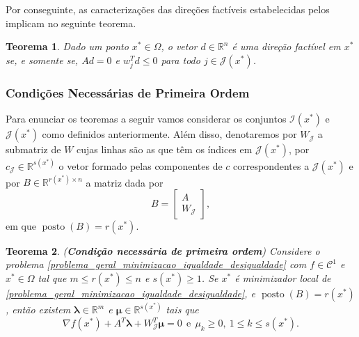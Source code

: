 \documentclass[12pt,a4paper]{scrartcl}
\DeclareMathOperator{\posto}{posto}
\def\RR{\mathds{R}}
\newtheorem{teo}{Teorema}
\theoremstyle{definition}%
\begin{document}
Por conseguinte, as caracterizações das direções factíveis estabelecidas pelos  implicam no seguinte teorema. 
\begin{teo} \label{teo:direcao_factivel_desigualdade_e_igualdade}
Dado um ponto $x^{*} \in \Omega$, o vetor $d\in \RR^{n}$ é uma direção factível em $x^{*}$ se, e somente se, $Ad =0$ e $w_{j}^{T}d \leq 0$ para todo $j\in \mathcal{J}(x^{*})$.
\end{teo}


\subsubsection{Condições Necessárias de Primeira Ordem}

Para enunciar os teoremas a seguir vamos considerar os conjuntos $\mathcal{I}(x^{*})$ e $\mathcal{J}(x^{*})$ como definidos anteriormente. Além disso, denotaremos por $W_{\mathcal{J}}$ a submatriz de $W$ cujas linhas são as que têm os índices em $\mathcal{J}(x^{*})$, por $c_{\mathcal{J}} \in \RR^{s(x^{*})}$ o vetor formado pelas componentes de $c$ correspondentes a $\mathcal{J}(x^{*})$ e por $B \in \RR^{r(x^{*})\times n}$ a matriz dada por
\[
B = \begin{bmatrix*} A \\ W_{\mathcal{J}} \end{bmatrix*} ,
\]
em que $\posto (B)= r(x^{*})$.
\begin{teo}(\textbf{Condição necessária de primeira ordem}) \label{teo:KKT}
Considere o problema \eqref{problema_geral_minimizacao_igualdade_desigualdade} com $f\in \mathcal{C}^{1}$ e $x^{*} \in \Omega$ tal que $m\leq r(x^{*}) \leq n$ e $s(x^{*}) \geq 1$.
Se $x^{*}$ é minimizador local de \eqref{problema_geral_minimizacao_igualdade_desigualdade}, e $\posto (B)= r(x^{*})$, então existem $\boldsymbol{\lambda} \in \RR^{m}$ e $\boldsymbol{\mu} \in \RR^{s(x^{*})}$ tais que
\[ \label{eq:1_teo_KKT}
\nabla f(x^{*}) + A^{T}\boldsymbol{\lambda} + W^{T}_{\mathcal{J}} \boldsymbol{\mu} = 0 \ \ \text{e} \ \ \mu_{k} \geq 0, \ 1 \leq k \leq s(x^{*}) .
\]
\end{teo}
\end{document}
